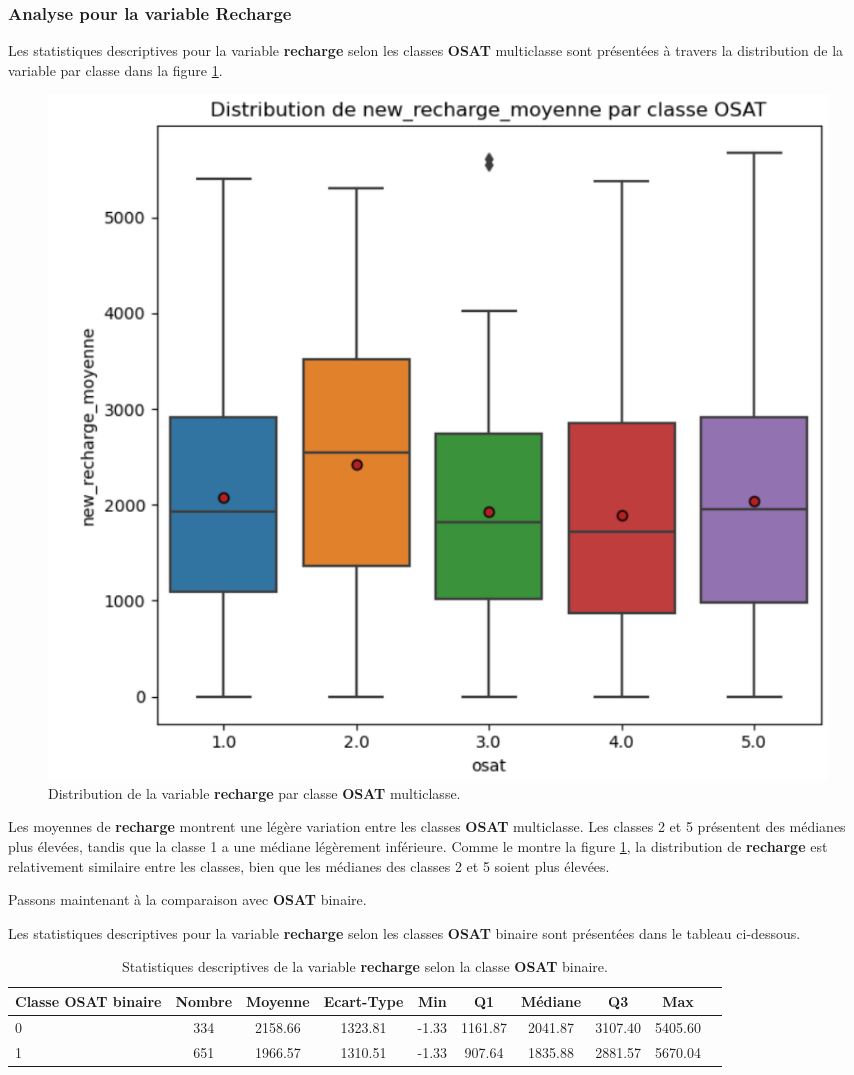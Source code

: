 \subsubsection*{Analyse pour la variable Recharge}
Les statistiques descriptives pour la variable \textbf{recharge} selon les classes \textbf{OSAT} multiclasse sont présentées à travers la distribution de la variable par classe dans la figure \ref{fig:analyse_descriptive_2}.

\begin{figure}[H]
    \centering
    \includegraphics[width=0.7\linewidth]{analyse_descriptive_2.png}
    \caption{Distribution de la variable \textbf{recharge} par classe \textbf{OSAT} multiclasse.}
    \label{fig:analyse_descriptive_2}
\end{figure}

Les moyennes de \textbf{recharge} montrent une légère variation entre les classes \textbf{OSAT} multiclasse. Les classes 2 et 5 présentent des médianes plus élevées, tandis que la classe 1 a une médiane légèrement inférieure. Comme le montre la figure \ref{fig:analyse_descriptive_2}, la distribution de \textbf{recharge} est relativement similaire entre les classes, bien que les médianes des classes 2 et 5 soient plus élevées.

Passons maintenant à la comparaison avec \textbf{OSAT} binaire.

Les statistiques descriptives pour la variable \textbf{recharge} selon les classes \textbf{OSAT} binaire sont présentées dans le tableau ci-dessous.

\begin{table}[H]
    \centering
    \begin{tabular}{p{2cm}ccccccccc} %
        \toprule
        Classe OSAT binaire & Nombre & Moyenne & Ecart-Type & Min & Q1 & Médiane & Q3 & Max \\
        \midrule
        0 & 334 & 2158.66 & 1323.81 & -1.33 & 1161.87 & 2041.87 & 3107.40 & 5405.60 \\
        1 & 651 & 1966.57 & 1310.51 & -1.33 & 907.64 & 1835.88 & 2881.57 & 5670.04 \\
        \bottomrule
    \end{tabular}
    \caption{Statistiques descriptives de la variable \textbf{recharge} selon la classe \textbf{OSAT} binaire.}
\end{table}

